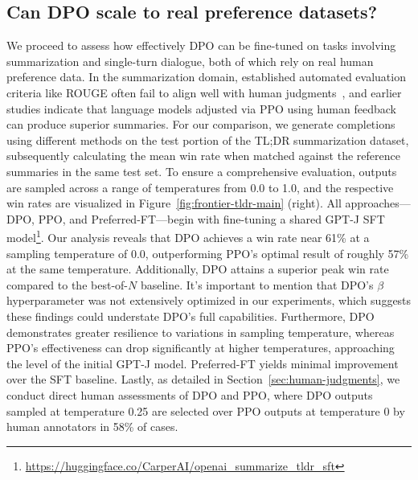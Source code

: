\subsection{Can DPO scale to real preference datasets?}
\label{sec:dpo-real-datasets}
We proceed to assess how effectively DPO can be fine-tuned on tasks involving summarization and single-turn dialogue, both of which rely on real human preference data. In the summarization domain, established automated evaluation criteria like ROUGE often fail to align well with human judgments~\citep{stiennon2022learning}, and earlier studies indicate that language models adjusted via PPO using human feedback can produce superior summaries. For our comparison, we generate completions using different methods on the test portion of the TL;DR summarization dataset, subsequently calculating the mean win rate when matched against the reference summaries in the same test set. To ensure a comprehensive evaluation, outputs are sampled across a range of temperatures from 0.0 to 1.0, and the respective win rates are visualized in Figure~\ref{fig:frontier-tldr-main} (right). All approaches—DPO, PPO, and Preferred-FT—begin with fine-tuning a shared GPT-J SFT model\footnote{\url{https://huggingface.co/CarperAI/openai_summarize_tldr_sft}}. Our analysis reveals that DPO achieves a win rate near 61\% at a sampling temperature of 0.0, outperforming PPO’s optimal result of roughly 57\% at the same temperature. Additionally, DPO attains a superior peak win rate compared to the best-of-$N$ baseline. It's important to mention that DPO's $\beta$ hyperparameter was not extensively optimized in our experiments, which suggests these findings could understate DPO’s full capabilities. Furthermore, DPO demonstrates greater resilience to variations in sampling temperature, whereas PPO's effectiveness can drop significantly at higher temperatures, approaching the level of the initial GPT-J model. Preferred-FT yields minimal improvement over the SFT baseline. Lastly, as detailed in Section~\ref{sec:human-judgments}, we conduct direct human assessments of DPO and PPO, where DPO outputs sampled at temperature 0.25 are selected over PPO outputs at temperature 0 by human annotators in 58\% of cases.

